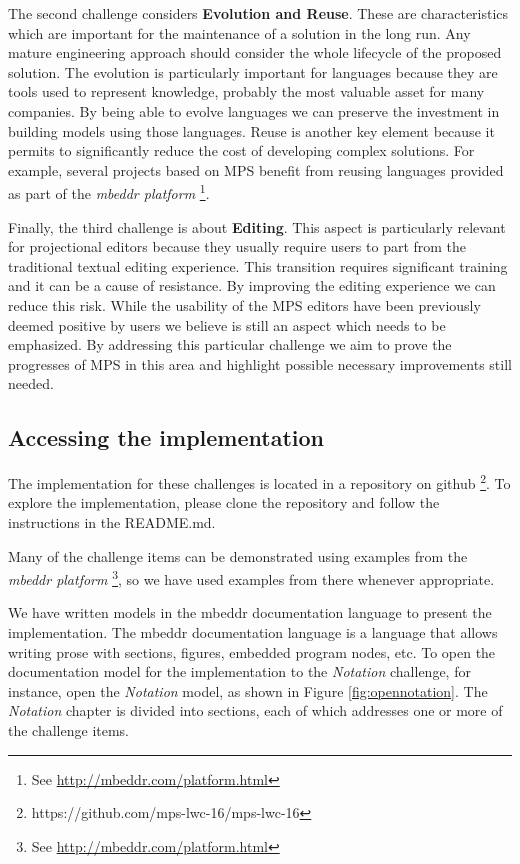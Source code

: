 \documentclass[preprint,numbers,10pt]{sigplanconf}
\begin{document}
The second challenge considers \textbf{Evolution and Reuse}. These are
characteristics which are important for the maintenance of a solution in the long run. Any
mature engineering approach should consider the whole lifecycle of the proposed
solution. The evolution is particularly important for languages because they are
tools used to represent knowledge, probably the most valuable asset for many
companies. By being able to evolve languages we can preserve the investment 
in building models using those languages. Reuse is another key element because
it permits to significantly reduce the cost of developing complex solutions. For
example, several projects based on MPS benefit from reusing languages provided
as part of the \emph{mbeddr platform} \footnote{See
\url{http://mbeddr.com/platform.html}}.

Finally, the third challenge is about \textbf{Editing}. This aspect is
particularly relevant for projectional editors because they usually require
users to part from the traditional textual editing experience. This transition
requires significant training and it can be a cause of resistance. By improving
the editing experience we can reduce this risk. While the usability of the MPS
editors have been previously deemed positive by users \cite{Voelter2014} we
believe is still an aspect which needs to be emphasized. By addressing this
particular challenge we aim to prove the progresses of MPS in this area and
highlight possible necessary improvements still needed.

\subsection{Accessing the implementation}
The implementation for these challenges is located in a repository on github
\footnote{https://github.com/mps-lwc-16/mps-lwc-16}. To explore the implementation,
please clone the repository and follow the instructions in the README.md.

Many of the challenge items can be demonstrated using examples from the
\emph{mbeddr platform} \footnote{See \url{http://mbeddr.com/platform.html}},
so we have used examples from there whenever appropriate.

We have written models in the mbeddr documentation language
to present the implementation. The mbeddr documentation language is a language that allows
writing prose with sections, figures, embedded program nodes, etc. 
To open the documentation model for the implementation to the \emph{Notation} challenge, for instance,
open the \emph{Notation} model, as shown in Figure \ref{fig:opennotation}. The \emph{Notation} chapter is
divided into sections, each of which addresses one or more of the challenge
items.
\end{document}
